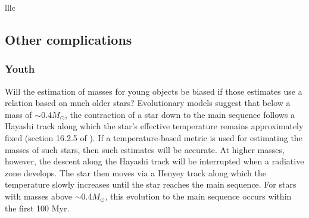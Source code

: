\documentclass[twocolumn,tighten,twocolappendix]{aastex631}
\begin{document}
\begin{deluxetable*}{lllc}
\end{deluxetable*}

\subsection{Other complications}

\subsubsection{Youth\label{sec:young-objects}}

Will the estimation of masses for young objects be biased if those estimates use a relation based on much older stars? Evolutionary models suggest that below a mass of $\sim0.4 M_\odot$, the contraction of a star down to the main sequence follows a Hayashi track along which the star's effective temperature remains approximately fixed (section 16.2.5 of \citealt{stahler2004}). If a temperature-based metric is used for estimating the masses of such stars, then such estimates will be accurate. At higher masses, however, the descent along the Hayashi track will be interrupted when a radiative zone develops. The star then moves via a Henyey track along which the temperature slowly increases until the star reaches the main sequence. For stars with masses above $\sim0.4 M_\odot$, this evolution to the main sequence occurs within the first 100 Myr.


\end{document}
